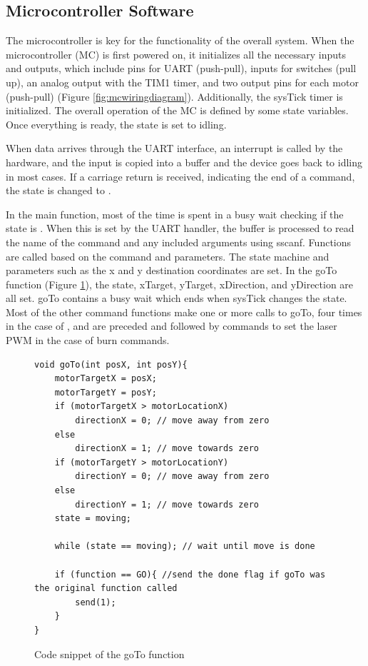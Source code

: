 \documentclass[11pt]{LaTeX-Classes/math-hw}
\begin{document}
\subsection{Microcontroller Software}
The microcontroller is key for the functionality of the overall system.
When the microcontroller (MC) is first powered on, it initializes all the necessary inputs and outputs,
which include pins for UART (push-pull), inputs for switches (pull up),
an analog output with the TIM1 timer,
and two output pins for each motor (push-pull) (Figure \ref{fig:mcwiringdiagram}).
Additionally, the sysTick timer is initialized. The overall operation of the MC is defined by some
state variables. Once everything is ready, the state is set to idling.

When data arrives through the UART interface, an interrupt is called by the hardware, and the
input is copied into a buffer and the device goes back to idling in most cases.
If a carriage return is received, indicating the end of a command,
the state is changed to .

In the main function, most of the time is spent in a busy wait checking if the state is .
When this is set by the UART handler,
the buffer is processed to read the name of the command and any included arguments using sscanf.
Functions are called based on the command and parameters.
The state machine and parameters such as the x and y destination coordinates are set.
In the goTo function (Figure \ref{fig:gotoFunction}), the state, xTarget, yTarget, xDirection,
and yDirection are all set.
goTo contains a busy wait which ends when sysTick changes the state.
Most of the other command functions make one or more calls to goTo,
four times in the case of , and are preceded and followed by
commands to set the laser PWM in the case of burn commands.

\begin{figure}[H]
 \begin{center}
   \begin{verbatim}
void goTo(int posX, int posY){
	motorTargetX = posX;
	motorTargetY = posY;
	if (motorTargetX > motorLocationX)
		directionX = 0; // move away from zero
	else
		directionX = 1; // move towards zero
	if (motorTargetY > motorLocationY)
		directionY = 0; // move away from zero
	else
		directionY = 1; // move towards zero
	state = moving;

	while (state == moving); // wait until move is done

	if (function == GO){ //send the done flag if goTo was the original function called
		send(1);
	}
}
   \end{verbatim}
   \caption{Code snippet of the goTo function}
   \label{fig:gotoFunction}
 \end{center}
\end{figure}
\end{document}
